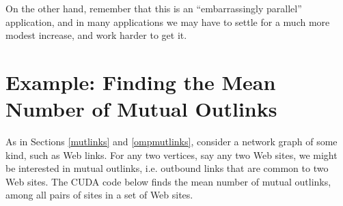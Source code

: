 On the other hand, remember that this is an ``embarrassingly parallel''
application, and in many applications we may have to settle for a much
more modest increase, and work harder to get it.

\section{Example:  Finding the Mean Number of Mutual Outlinks}

As in Sections \ref{mutlinks} and \ref{ompmutlinks}, consider a network
graph of some kind, such as Web links.  For any two vertices, say any
two Web sites, we might be interested in mutual outlinks, i.e. outbound
links that are common to two Web sites.  The CUDA code below finds the
mean number of mutual outlinks, among all pairs of sites in a set of Web
sites.  

